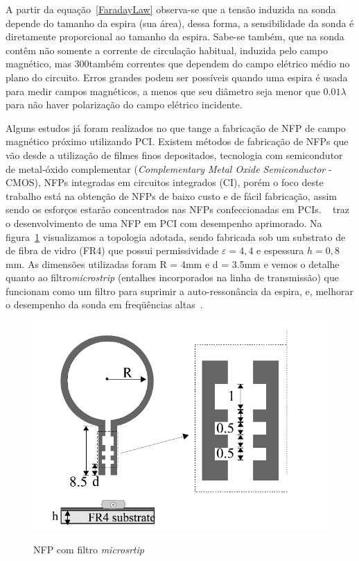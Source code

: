 
A partir da equação~\ref{FaradayLaw} observa-se que a tensão induzida na sonda depende do tamanho da espira (sua área), dessa forma, a sensibilidade da sonda é diretamente proporcional ao tamanho da espira. Sabe-se também, que na sonda contêm não somente a corrente de circulação habitual, induzida pelo campo magnético, mas 
300também correntes que dependem do campo elétrico médio no plano do circuito. Erros grandes podem ser possíveis quando uma
espira é usada para medir campos magnéticos, a menos que seu diâmetro seja menor que $0.01 \lambda$~\cite[p.~25]{sivaraman2017} para não haver polarização do campo elétrico incidente.

Alguns estudos já foram realizados no que tange a fabricação de NFP de campo magnético próximo utilizando PCI. Existem métodos de fabricação de NFPs que vão desde a utilização de filmes finos depositados, tecnologia com semicondutor de metal-óxido complementar (\textit{Complementary Metal Oxide Semiconductor} - CMOS), NFPs integradas em circuitos integrados (CI), porém o foco deste trabalho está na obtenção de NFPs de baixo custo e de fácil fabricação, assim sendo os esforços estarão concentrados nas NFPs confeccionadas em PCIs. ~ traz o desenvolvimento de uma NFP em PCI com desempenho aprimorado. Na figura~\ref{fig:lin2009} visualizamos a topologia adotada, sendo fabricada sob um substrato de de fibra de vidro (FR4) que possui permissividade $\varepsilon = 4,4$ e espessura $ h = 0,8$mm. As dimensões utilizadas foram R = 4mm e d = 3.5mm e vemos o detalhe quanto ao filtro\textit{microstrip} (entalhes incorporados na linha de transmissão) que funcionam como um filtro para suprimir a auto-ressonância da espira, e, melhorar o desempenho da sonda em freqüências altas~\cite[p.~2]{lin2009}.

\begin{figure}[htb!]
	\centering 
	\caption{NFP com filtro \textit{microsrtip}}
	\includegraphics[scale=0.6]{./img/lin2009}
	\label{fig:lin2009}
\end{figure}


